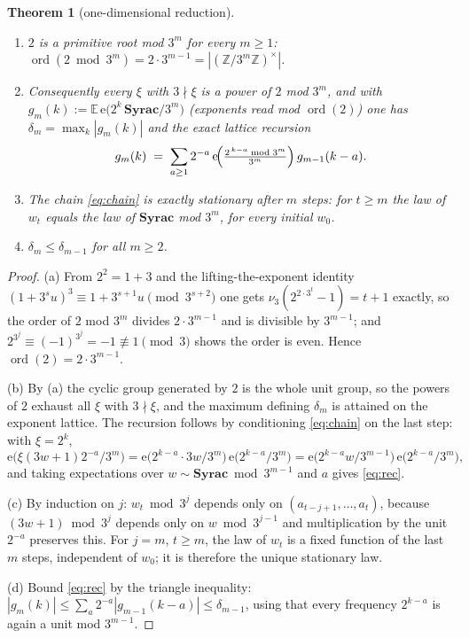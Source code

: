 \documentclass[11pt]{article}
\newtheorem{theorem}{Theorem}[section]
\theoremstyle{definition}
\DeclareMathOperator{\ord}{ord}
\newcommand{\Z}{\mathbb{Z}}
\newcommand{\E}{\mathbb{E}}
\newcommand{\e}{\mathrm{e}}
\begin{document}
\begin{theorem}[one-dimensional reduction]\label{thm:onedim}
\begin{enumerate}
\item[(a)] $2$ is a primitive root mod $3^m$ for every $m\ge 1$:
  $\ord(2 \bmod 3^m)=2\cdot 3^{m-1}=|(\Z/3^m\Z)^{\times}|$.
\item[(b)] Consequently every $\xi$ with $3\nmid\xi$ is a power of
  $2$ mod $3^m$, and with
  $g_m(k):=\E\,\e\!\bigl(2^{k}\,\mathbf{Syrac}/3^m\bigr)$ (exponents read
  mod $\ord(2)$) one has $\delta_m=\max_k |g_m(k)|$ and the exact lattice
  recursion
  \begin{equation}\label{eq:rec}
  g_m(k)\;=\;\sum_{a\ge 1}2^{-a}\,
  \e\!\Bigl(\tfrac{2^{\,k-a} \bmod 3^m}{3^m}\Bigr)\,g_{m-1}(k-a).
  \end{equation}
\item[(c)] The chain \eqref{eq:chain} is \emph{exactly} stationary after
  $m$ steps: for $t\ge m$ the law of $w_t$ equals the law of
  $\mathbf{Syrac}$ mod $3^m$, for every initial $w_0$.
\item[(d)] $\delta_m\le\delta_{m-1}$ for all $m\ge 2$.
\end{enumerate}
\end{theorem}

\begin{proof}
(a) From $2^2=1+3$ and the lifting-the-exponent identity
$(1+3^s u)^3\equiv 1+3^{s+1}u \pmod{3^{s+2}}$ one gets
$\nu_3(2^{2\cdot 3^{t}}-1)=t+1$ exactly, so the order of $2$ mod $3^m$
divides $2\cdot 3^{m-1}$ and is divisible by $3^{m-1}$; and
$2^{3^j}\equiv (-1)^{3^j}=-1\not\equiv 1 \pmod 3$ shows the order is
even. Hence $\ord(2)=2\cdot 3^{m-1}$.

(b) By (a) the cyclic group generated by $2$ is the whole unit group, so
the powers of $2$ exhaust all $\xi$ with $3\nmid\xi$, and the maximum
defining $\delta_m$ is attained on the exponent lattice. The recursion follows by
conditioning \eqref{eq:chain} on the last step: with $\xi=2^k$,
\[
\e\!\bigl(\xi(3w+1)2^{-a}/3^m\bigr)
=\e\!\bigl(2^{k-a}\cdot 3w/3^m\bigr)\,\e\!\bigl(2^{k-a}/3^m\bigr)
=\e\!\bigl(2^{k-a}w/3^{m-1}\bigr)\,\e\!\bigl(2^{k-a}/3^m\bigr),
\]
and taking expectations over $w\sim\mathbf{Syrac}\bmod 3^{m-1}$ and $a$
gives \eqref{eq:rec}.

(c) By induction on $j$: $w_t\bmod 3^j$ depends only on
$(a_{t-j+1},\dots,a_t)$, because $(3w+1)\bmod 3^{j}$ depends only on
$w\bmod 3^{j-1}$ and multiplication by the unit $2^{-a}$ preserves this.
For $j=m$, $t\ge m$, the law of $w_t$ is a fixed function of the last $m$
steps, independent of $w_0$; it is therefore the unique stationary law.

(d) Bound \eqref{eq:rec} by the triangle inequality:
$|g_m(k)|\le\sum_a 2^{-a}|g_{m-1}(k-a)|\le\delta_{m-1}$, using that every
frequency $2^{k-a}$ is again a unit mod $3^{m-1}$.
\end{proof}
\end{document}
